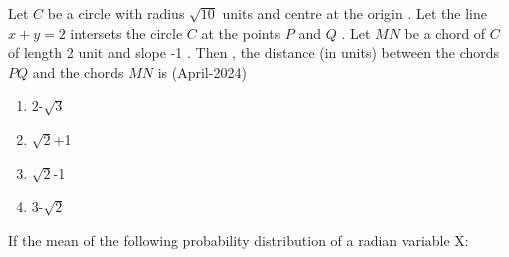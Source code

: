 \item Let $C$ be a circle with radius $\sqrt{10}$ units and centre at the origin . Let the line $x+y=2$ intersets the circle $C$ at the points $P$ and $Q$ . Let $MN$ be a chord of $C$ of length 2 unit and slope -1 . Then , the distance (in units) between the chords $PQ$ and the chords $MN$ is
\hfill{(April-2024)}
\begin{multicols}{2}
\begin{enumerate}
\item 2-$\sqrt{3}$
\item $\sqrt{2}$+1 
\item $\sqrt{2}$-1
\item 3-$\sqrt{2}$
\end{enumerate}
\end{multicols}
\item If the mean of the following probability distribution of a radian variable X:\\

